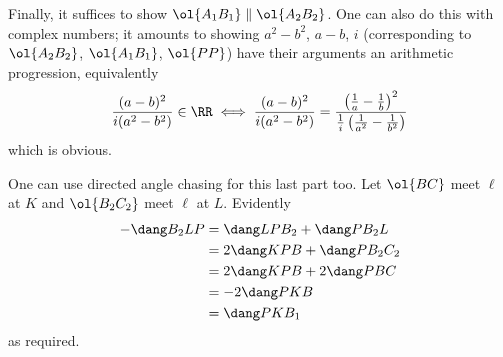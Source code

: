 Finally, it suffices to show $\ol{A_1B_1} \parallel \ol{A_2B_2}$.
One can also do this with complex numbers;
it amounts to showing $a^2-b^2$, $a-b$, $i$
(corresponding to $\ol{A_2 B_2}$, $\ol{A_1 B_1}$, $\ol{PP}$)
have their arguments an arithmetic progression, equivalently
\[ \frac{(a-b)^2}{i(a^2-b^2)} \in \RR
  \iff
  \frac{(a-b)^2}{i(a^2-b^2)}
  = \frac{\left( \frac 1a-\frac1b \right)^2}
  {\frac1i\left(\frac{1}{a^2}-\frac{1}{b^2}\right)}
\]
which is obvious.
\begin{remark*}
One can use directed angle chasing for this last part too.
Let $\ol{BC}$ meet $\ell$ at $K$ and $\ol{B_2C_2}$ meet $\ell$ at $L$.
Evidently
\begin{align*}
  -\dang B_2LP &= \dang LPB_2 + \dang PB_2L \\
  &= 2 \dang KPB + \dang PB_2C_2 \\
  &= 2 \dang KPB + 2\dang PBC \\
  &= -2\dang PKB \\
  &= \dang PKB_1 \\
\end{align*}
as required.
\end{remark*}
\pagebreak



